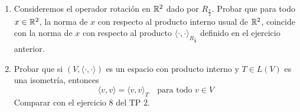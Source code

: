 \item \begin{enumerate}
        \item Consideremos el operador rotación en $\mathbb{R}^2$ dado por $R_\frac{\pi}{2}$. Probar que para todo $x\in\mathbb{R}^2$, la norma de $x$ con respecto al producto interno usual de $\mathbb{R}^2$, coincide con la norma de $x$ con respecto al producto $\langle\cdot,\cdot\rangle_{R_\frac{\pi}{2}}$ definido en el ejercicio anterior.
            \begin{mdframed}[style=s]
                
            \end{mdframed}
        \item Probar que si $(V,\langle\cdot,\cdot\rangle)$ es un espacio con producto interno y $T\in L(V)$ es una isometría, entonces\[\langle v,v\rangle=\langle v,v\rangle_T\quad\text{para todo }v\in V\]
            Comparar con el ejercicio 8 del TP 2.
            \begin{mdframed}[style=s]
                
            \end{mdframed}
    \end{enumerate}